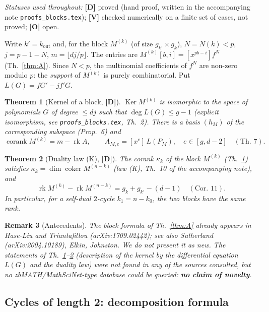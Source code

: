 \documentclass[11pt,a4paper]{article}
\newtheorem{theorem}{Theorem}[section]
\newtheorem{remark}[theorem]{Remark}
\DeclareMathOperator{\Ker}{Ker}
\begin{document}
\emph{Statuses used throughout:} \textbf{[D]} proved (hand proof, written in
the accompanying note \texttt{proofs\_blocks.tex}); \textbf{[V]} checked numerically on a
finite set of cases, not proved; \textbf{[O]} open.

Write $k'=k_{\mathrm{out}}$ and, for the block $M^{(k)}$ (of size
$g_{k'}\times g_k$), $N=N(k)<p$, $j=p-1-N$, $m=\lfloor dj/p\rfloor$. The entries
are $M^{(k)}[b,i]=[x^{pb-i}]f^N$ (Th.~\ref{thm:A}). Since $N<p$, the
multinomial coefficients of $f^N$ are non-zero modulo $p$: the \emph{support} of
$M^{(k)}$ is purely combinatorial. Put $L(G)=fG'-jf'G$.

\begin{theorem}[Kernel of a block, \textbf{[D]}]
\label{thm:noyau}
$\Ker M^{(k)}$ is isomorphic to the space of polynomials $G$ of degree
$\le dj$ such that $\deg L(G)\le g-1$ (explicit isomorphism, see
\texttt{proofs\_blocks.tex}, Th.~2). There is a basis $(h_M)$ of the corresponding
subspace (Prop.~6) and
$$\operatorname{corank}M^{(k)}=m-\operatorname{rk}A,\qquad
A_{M,e}=[x^e]\,L(P_M),\quad e\in[g,d-2]\quad(\text{Th.~7}).$$
\end{theorem}

\begin{theorem}[Duality law (K), \textbf{[D]}]
\label{thm:K}
The corank $\kappa_k$ of the block $M^{(k)}$ (Th.~\ref{thm:noyau}) satisfies
$\kappa_k=\dim\operatorname{coker}M^{(n-k)}$ (law (K), Th.~10 of the accompanying
note), and
$$\operatorname{rk}M^{(k)}-\operatorname{rk}M^{(n-k)}=g_k+g_{k'}-(d-1)\quad(\text{Cor.~11}).$$
In particular, for a self-dual $2$-cycle $k_1=n-k_0$, the two blocks have the
same rank.
\end{theorem}

\begin{remark}[Antecedents]
The block formula of Th.~\ref{thm:A} already appears in Hase-Liu and
Triantafillou (arXiv:1709.02442); see also Sutherland (arXiv:2004.10189), Elkin,
Johnston. We do not present it as new. The statements of
Th.~\ref{thm:noyau}--\ref{thm:K} (description of the kernel by the differential
equation $L(G)$ and the duality law) were not found in any of the sources
consulted, but no zbMATH/MathSciNet-type database could be queried:
\textbf{no claim of novelty}.
\end{remark}

\subsection*{Cycles of length 2: decomposition formula}
\end{document}
